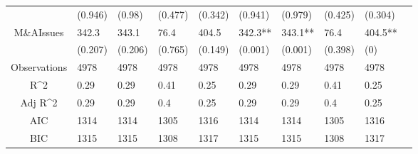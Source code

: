 \documentclass{article}
\begin{document}
\begin{table}[H]
\begin{tabular}{|clllllllll|}
   & (0.946) & (0.98) & (0.477) & (0.342) & (0.941) & (0.979) & (0.425) & (0.304) & \\ 
  M\&AIssues & 342.3 & 343.1 & 76.4 & 404.5 & 342.3** & 343.1** & 76.4 & 404.5** & \\ 
   & (0.207) & (0.206) & (0.765) & (0.149) & (0.001) & (0.001) & (0.398) & (0) & \\ 
  \hline 
 Observations & 4978 & 4978 & 4978 & 4978 & 4978 & 4978 & 4978 & 4978 & \\ 
  R^2 & 0.29 & 0.29 & 0.41 & 0.25 & 0.29 & 0.29 & 0.41 & 0.25 & \\ 
  Adj R^2 & 0.29 & 0.29 & 0.4 & 0.25 & 0.29 & 0.29 & 0.4 & 0.25 & \\ 
  AIC & 1314 & 1314 & 1305 & 1316 & 1314 & 1314 & 1305 & 1316 & \\ 
  BIC & 1315 & 1315 & 1308 & 1317 & 1315 & 1315 & 1308 & 1317 & \\ 
   \hline
\end{tabular}
 
\end{table}
\end{document}
